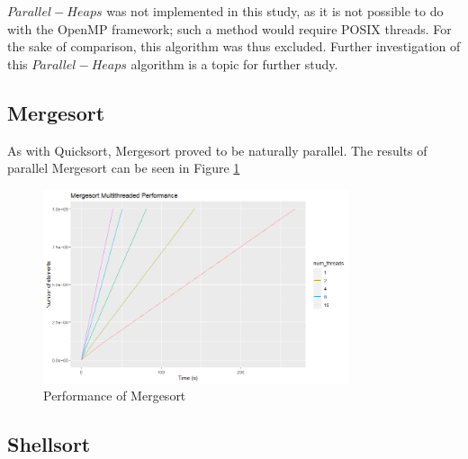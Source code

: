 \documentclass[conference]{IEEEtran}
\begin{document}
    $Parallel-Heaps$ was not implemented in this study, as it is not possible to do with the OpenMP framework; such a method would require POSIX threads. 
    For the sake of comparison, this algorithm was thus excluded. 
    Further investigation of this $Parallel-Heaps$ algorithm is a topic for further study.  
    \subsection{Mergesort}
    As with Quicksort, Mergesort proved to be naturally parallel. 
    The results of parallel Mergesort can be seen in Figure \ref{ms_per}
    \begin{figure}[h]
        \includegraphics[width=9cm]{ms_per.png} 
        \caption{Performance of Mergesort}
        \label{ms_per}
    \end{figure}
    
    
    
    \subsection{Shellsort}
    
    
\end{document}

